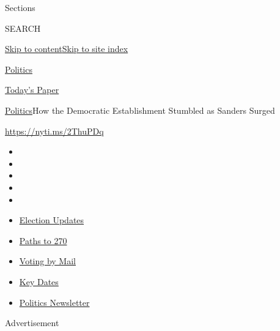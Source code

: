 Sections

SEARCH

\protect\hyperlink{site-content}{Skip to
content}\protect\hyperlink{site-index}{Skip to site index}

\href{https://www.nytimes3xbfgragh.onion/section/politics}{Politics}

\href{https://myaccount.nytimes3xbfgragh.onion/auth/login?response_type=cookie\&client_id=vi}{}

\href{https://www.nytimes3xbfgragh.onion/section/todayspaper}{Today's
Paper}

\href{/section/politics}{Politics}\textbar{}How the Democratic
Establishment Stumbled as Sanders Surged

\url{https://nyti.ms/2ThuPDq}

\begin{itemize}
\item
\item
\item
\item
\item
\end{itemize}

\begin{itemize}
\item
  \href{https://www.nytimes3xbfgragh.onion/live/2020/09/08/us/trump-vs-biden?action=click\&pgtype=Article\&state=default\&region=TOP_BANNER\&context=storylines_menu}{Election
  Updates}
\item
  \href{https://www.nytimes3xbfgragh.onion/interactive/2020/us/elections/election-states-biden-trump.html?action=click\&pgtype=Article\&state=default\&region=TOP_BANNER\&context=storylines_menu}{Paths
  to 270}
\item
  \href{https://www.nytimes3xbfgragh.onion/interactive/2020/08/31/us/politics/vote-by-mail-deadlines.html?action=click\&pgtype=Article\&state=default\&region=TOP_BANNER\&context=storylines_menu}{Voting
  by Mail}
\item
  \href{https://www.nytimes3xbfgragh.onion/interactive/2019/us/elections/2020-presidential-election-calendar.html?action=click\&pgtype=Article\&state=default\&region=TOP_BANNER\&context=storylines_menu}{Key
  Dates}
\item
  \href{https://www.nytimes3xbfgragh.onion/newsletters/politics?action=click\&pgtype=Article\&state=default\&region=TOP_BANNER\&context=storylines_menu}{Politics
  Newsletter}
\end{itemize}

Advertisement

